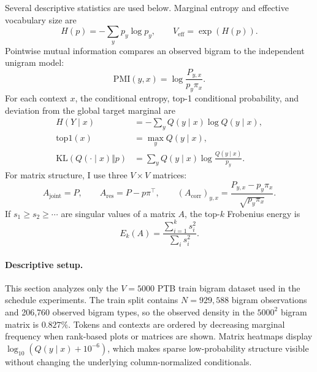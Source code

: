 \documentclass[11pt]{article}
\begin{document}
Several descriptive statistics are used below. Marginal entropy and effective vocabulary size are
\begin{equation}
H(p)=-\sum_y p_y\log p_y,
\qquad
V_{\mathrm{eff}}=\exp(H(p)).
\end{equation}
Pointwise mutual information compares an observed bigram to the independent unigram model:
\begin{equation}
\mathrm{PMI}(y,x)=\log\frac{P_{y,x}}{p_y\pi_x}.
\end{equation}
For each context \(x\), the conditional entropy, top-1 conditional probability, and deviation from the global target marginal are
\begin{align}
H(Y\mid x)&=-\sum_y Q(y\mid x)\log Q(y\mid x),\\
\mathrm{top1}(x)&=\max_y Q(y\mid x),\\
\mathrm{KL}(Q(\cdot\mid x)\Vert p)&=\sum_y Q(y\mid x)\log\frac{Q(y\mid x)}{p_y}.
\end{align}
For matrix structure, I use three \(V\times V\) matrices:
\begin{equation}
A_{\mathrm{joint}}=P,\qquad
A_{\mathrm{res}}=P-p\pi^\top,\qquad
(A_{\mathrm{corr}})_{y,x}=\frac{P_{y,x}-p_y\pi_x}{\sqrt{p_y\pi_x}}.
\end{equation}
If \(s_1\ge s_2\ge\cdots\) are singular values of a matrix \(A\), the top-\(k\) Frobenius energy is
\begin{equation}
E_k(A)=\frac{\sum_{i=1}^{k}s_i^2}{\sum_i s_i^2}.
\end{equation}

\paragraph{Descriptive setup.}
This section analyzes only the \(V=5000\) PTB train bigram dataset used in the schedule experiments. The train split contains \(N=929{,}588\) bigram observations and 206,760 observed bigram types, so the observed density in the \(5000^2\) bigram matrix is \(0.827\%\). Tokens and contexts are ordered by decreasing marginal frequency when rank-based plots or matrices are shown. Matrix heatmaps display \(\log_{10}(Q(y\mid x)+10^{-6})\), which makes sparse low-probability structure visible without changing the underlying column-normalized conditionals.
\end{document}
